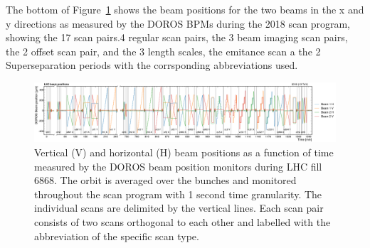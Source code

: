 The bottom of Figure~\ref{BeamPosition_2018} shows the beam positions for the two beams in the x and y directions as measured by the DOROS BPMs during the 2018 scan program, showing the 17 scan pairs.4 regular scan pairs, the 3 beam imaging scan pairs, the 2 offset scan pair, and the 3 length scales, the emitance scan a the 2 Superseparation periods with the corrsponding abbreviations used.  




  \begin{figure}[h]
  \hspace{-0.4cm}
    \includegraphics[scale=.17]{Chapter3/BeamPosition/doros_vs_time_6868.pdf}
    \caption[Doros]{Vertical (V) and horizontal (H) beam positions as a function of time measured by the DOROS beam position monitors during LHC fill 6868. The orbit is averaged over the bunches and monitored throughout the scan program with 1 second time granularity. The individual scans are delimited by the vertical lines. Each scan pair consists of two scans orthogonal to each other and labelled with the abbreviation of the specific scan type.}
    \label{BeamPosition_2018}
  \end{figure}


